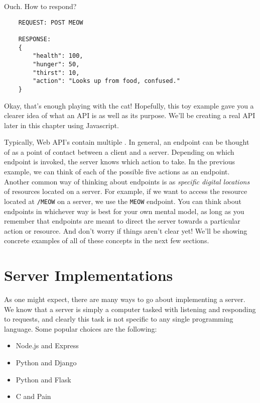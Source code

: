 \begin{kaobox}[title=Let's take a look at an example of a simple API.]
    Ouch. How to respond?

    \begin{verbatim}
    REQUEST: POST MEOW

    RESPONSE: 
    {
        "health": 100,
        "hunger": 50,
        "thirst": 10,
        "action": "Looks up from food, confused."
    }
    \end{verbatim}

    Okay, that's enough playing with the cat! Hopefully, this toy example gave you a clearer idea of what an API is as well as its purpose. We'll be creating a real API later in this chapter using Javascript.

\end{kaobox}

Typically, Web API's contain multiple . In general, an endpoint can be thought of as a point of contact between a client and a server. Depending on which endpoint is invoked, the server knows which action to take. In the previous example, we can think of each of the possible five actions as an endpoint. Another common way of thinking about endpoints is as \emph{specific digital locations} of resources located on a server. For example, if we want to access the resource located at \texttt{/MEOW} on a server, we use the \texttt{MEOW} endpoint. You can think about endpoints in whichever way is best for your own mental model, as long as you remember that endpoints are meant to direct the server towards a particular action or resource. And don't worry if things aren't clear yet! We'll be showing concrete examples of all of these concepts in the next few sections.

\section{Server Implementations}

As one might expect, there are many ways to go about implementing a server. We know that a server is simply a computer tasked with listening and responding to requests, and clearly this task is not specific to any single programming language. Some popular choices are the following:

\begin{itemize}
    \item Node.js and Express
    \item Python and Django
    \item Python and Flask
    \item C and Pain
\end{itemize}


